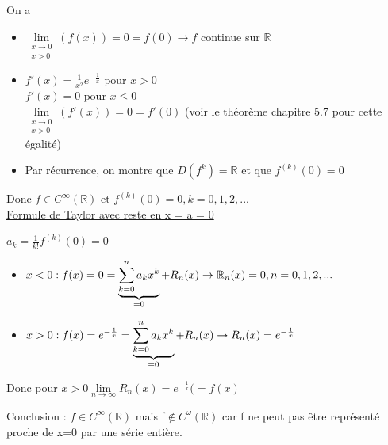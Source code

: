 \documentclass[12pt,a4paper]{article}
\newcommand{\somme}[2]{\ensuremath{\sum\limits_{#2}^{#1}}}
\newcommand{\limite}{\lim\limits_}
\newcommand{\llimite}[3]{\limite{\substack{#1 \\ #2}}\left(#3\right)}
\newcommand{\ninf}{\ensuremath{n \to \infty}}
\newcommand{\R}{\ensuremath{\mathbb{R}} }
\newcommand{\pour}{\mbox{ pour }}
\begin{document}
{On a \begin{itemize}
	\item $\llimite{x\to 0}{x>0}{f(x)} = 0 = f(0) \to f$ continue sur \R
	\item $f'(x) = \frac{1}{x^2}e^{-\frac{1}{x}} \pour x >0$\\
	$f'(x) = 0 \pour x \leq 0$\\
	$\llimite{x\to 0}{x>0}{f'(x)} = 0 = f'(0)$ (voir le théorème chapitre 5.7 pour cette égalité)
	\item Par récurrence, on montre que $D(f^k) = \R$ et que $f^{(k)}(0) = 0$\\
\end{itemize}
Donc $f\in C^\infty(\R)$ et $f^{(k)}(0) = 0, k = 0,1,2,...$\\
\underline{Formule de Taylor avec reste en x = a = 0}
\begin{boite}[0.25]
$a_k = \frac{1}{k!}f^{(k)}(0) = 0$
\end{boite}
\begin{itemize}
	\item $x < 0 : f(x) = 0 = \underbrace{\somme{n}{k=0}{a_kx^k}}_{=0} + R_n(x)\\
	\to \R_n(x) = 0, n = 0,1,2,...$
	\item $x > 0 : f(x) = e^{-\frac{1}{x}} = \underbrace{\somme{n}{k=0}{a_kx^k}}_{=0} +R_n(x)\\
	\to R_n(x) = e^{-\frac{1}{x}}$
\end{itemize}
Donc pour $x > 0 \limite{\ninf}R_n(x) = e^{-\frac{1}{x}} (=f(x)$
\begin{boite}
Conclusion : $f\in C^\infty(\R)$ mais f$\not\in C^{\omega}(\R)$ car f ne peut pas être représenté proche de x=0 par une série entière.
\end{boite}

}
\end{document}
